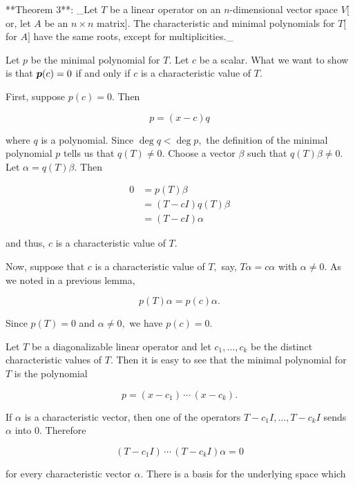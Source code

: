 

**Theorem 3**: _Let \(T\) be a linear operator on an \(n\)-dimensional vector space \(V\)\([\)or, let \(A\) be an \(n\times n\) matrix\(].\) The characteristic and minimal polynomials for \(T\)\([\)for \(A]\) have the same roots, except for multiplicities._

Let \(p\) be the minimal polynomial for \(T.\) Let \(c\) be a scalar. What we want to show is that \(\mbox{\boldmath$p$}(c)=0\) if and only if \(c\) is a characteristic value of \(T.\)

First, suppose \(p(c)=0.\) Then

\[p=(x-c)q\]

where \(q\) is a polynomial. Since \(\deg q<\deg p,\) the definition of the minimal polynomial \(p\) tells us that \(q(T)\neq 0.\) Choose a vector \(\beta\) such that \(q(T)\beta\neq 0.\) Let \(\alpha=q(T)\beta.\) Then

\[\begin{array}{rl}0&=p(T)\beta\\ &=(T-cI)q(T)\beta\\ &=(T-cI)\alpha\end{array}\]

and thus, \(c\) is a characteristic value of \(T.\)

Now, suppose that \(c\) is a characteristic value of \(T,\) say, \(T\alpha=c\alpha\) with \(\alpha\neq 0.\) As we noted in a previous lemma,

\[p(T)\alpha=p(c)\alpha.\]

Since \(p(T)=0\) and \(\alpha\neq 0,\) we have \(p(c)=0.\)

Let \(T\) be a diagonalizable linear operator and let \(c_{1},\ldots,c_{k}\) be the distinct characteristic values of \(T.\) Then it is easy to see that the minimal polynomial for \(T\) is the polynomial

\[p=(x-c_{1})\,\cdots\,(x-c_{k}).\]

If \(\alpha\) is a characteristic vector, then one of the operators \(T-c_{1}I,\ldots,\)\(T-c_{k}I\) sends \(\alpha\) into \(0.\) Therefore

\[(T-c_{1}I)\,\cdots\,(T-c_{k}I)\alpha=0\]

for every characteristic vector \(\alpha.\) There is a basis for the underlying space which